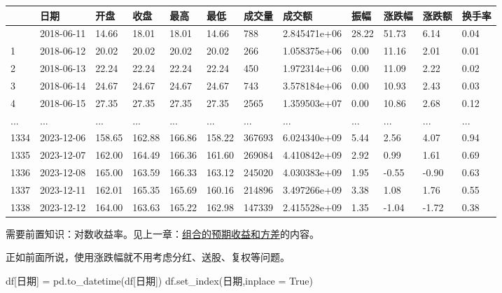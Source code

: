 \documentclass[
  letterpaper,
  DIV=11,
  numbers=noendperiod]{scrreprt}
\newenvironment{Shaded}{\begin{snugshade}}{\end{snugshade}}
\newcommand{\NormalTok}[1]{\textcolor[rgb]{0.00,0.23,0.31}{#1}}
\newcommand{\OperatorTok}[1]{\textcolor[rgb]{0.37,0.37,0.37}{#1}}
\newcommand{\StringTok}[1]{\textcolor[rgb]{0.13,0.47,0.30}{#1}}
\newcommand{\VariableTok}[1]{\textcolor[rgb]{0.07,0.07,0.07}{#1}}
\begin{document}
\begin{longtable}[]{@{}llllllllllll@{}}
\toprule\noalign{}
& 日期 & 开盘 & 收盘 & 最高 & 最低 & 成交量 & 成交额 & 振幅 & 涨跌幅 &
涨跌额 & 换手率 \\
\midrule\noalign{}
\endhead
\bottomrule\noalign{}
\endlastfoot
0 & 2018-06-11 & 14.66 & 18.01 & 18.01 & 14.66 & 788 & 2.845471e+06 &
28.22 & 51.73 & 6.14 & 0.04 \\
1 & 2018-06-12 & 20.02 & 20.02 & 20.02 & 20.02 & 266 & 1.058375e+06 &
0.00 & 11.16 & 2.01 & 0.01 \\
2 & 2018-06-13 & 22.24 & 22.24 & 22.24 & 22.24 & 450 & 1.972314e+06 &
0.00 & 11.09 & 2.22 & 0.02 \\
3 & 2018-06-14 & 24.67 & 24.67 & 24.67 & 24.67 & 743 & 3.578184e+06 &
0.00 & 10.93 & 2.43 & 0.03 \\
4 & 2018-06-15 & 27.35 & 27.35 & 27.35 & 27.35 & 2565 & 1.359503e+07 &
0.00 & 10.86 & 2.68 & 0.12 \\
... & ... & ... & ... & ... & ... & ... & ... & ... & ... & ... & ... \\
1334 & 2023-12-06 & 158.65 & 162.88 & 166.86 & 158.22 & 367693 &
6.024340e+09 & 5.44 & 2.56 & 4.07 & 0.94 \\
1335 & 2023-12-07 & 162.00 & 164.49 & 166.36 & 161.60 & 269084 &
4.410842e+09 & 2.92 & 0.99 & 1.61 & 0.69 \\
1336 & 2023-12-08 & 165.00 & 163.59 & 166.33 & 163.12 & 245020 &
4.030383e+09 & 1.95 & -0.55 & -0.90 & 0.63 \\
1337 & 2023-12-11 & 162.01 & 165.35 & 165.69 & 160.16 & 214896 &
3.497266e+09 & 3.38 & 1.08 & 1.76 & 0.55 \\
1338 & 2023-12-12 & 164.00 & 163.63 & 165.22 & 162.98 & 147339 &
2.415528e+09 & 1.35 & -1.04 & -1.72 & 0.38 \\
\end{longtable}

需要前置知识：对数收益率。见上一章：\href{https://py4ss.net/python/34-portfolio.html\#\%E7\%BB\%84\%E5\%90\%88\%E7\%9A\%84\%E9\%A2\%84\%E6\%9C\%9F\%E6\%94\%B6\%E7\%9B\%8A\%E5\%92\%8C\%E6\%96\%B9\%E5\%B7\%AE}{组合的预期收益和方差}的内容。

正如前面所说，使用涨跌幅就不用考虑分红、送股、复权等问题。

\begin{Shaded}
\begin{Highlighting}[]
\NormalTok{df[}\StringTok{\textquotesingle{}日期\textquotesingle{}}\NormalTok{] }\OperatorTok{=}\NormalTok{ pd.to\_datetime(df[}\StringTok{\textquotesingle{}日期\textquotesingle{}}\NormalTok{])}
\NormalTok{df.set\_index(}\StringTok{\textquotesingle{}日期\textquotesingle{}}\NormalTok{,inplace }\OperatorTok{=} \VariableTok{True}\NormalTok{)}
\end{Highlighting}
\end{Shaded}
\end{document}
